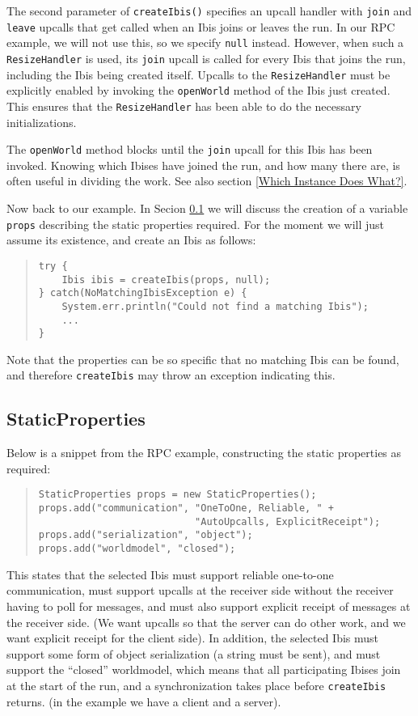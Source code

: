 \documentclass[10pt]{article}
\newcommand{\mysubsection}[1]{\subsection{#1}\label{#1}}
\begin{document}
The second parameter of \verb+createIbis()+ specifies an upcall handler
with \verb+join+ and \verb+leave+ upcalls that get called when an Ibis
joins or leaves the run.  In our RPC example, we will not use this, so we
specify \verb+null+ instead.  However, when such a \verb+ResizeHandler+
is used, its \verb+join+ upcall is called for every Ibis that joins the
run, including the Ibis being created itself.
Upcalls to the \verb+ResizeHandler+ must be explicitly enabled by
invoking the \verb+openWorld+ method of the Ibis
just created. This ensures that the \verb+ResizeHandler+ has been
able to do the necessary initializations.

The \verb+openWorld+ method blocks until the
\verb+join+ upcall for this Ibis has been invoked.  Knowing which Ibises
have joined the run, and how many there are, is often useful in dividing
the work. See also section \ref{Which Instance Does What?}.

Now back to our example. In Secion \ref{StaticProperties} we will
discuss the creation of a variable \texttt{props} describing the
static properties required. For the moment we will just assume its
existence, and create an Ibis as follows:
\begin{quote}
\begin{verbatim}
try {
    Ibis ibis = createIbis(props, null);
} catch(NoMatchingIbisException e) {
    System.err.println("Could not find a matching Ibis");
    ...
}
\end{verbatim}
\end{quote}
Note that the properties can be so specific that no matching Ibis
can be found, and therefore \verb+createIbis+ may throw an exception
indicating this.

\mysubsection{StaticProperties}

Below is a snippet from the RPC example, constructing the static
properties as required:
\begin{quote}
\begin{verbatim}
StaticProperties props = new StaticProperties();
props.add("communication", "OneToOne, Reliable, " + 
                           "AutoUpcalls, ExplicitReceipt");
props.add("serialization", "object");
props.add("worldmodel", "closed");
\end{verbatim}
\end{quote}
This states that the selected Ibis must support reliable one-to-one
communication, must support upcalls at the receiver side without the
receiver having to poll for messages, and must also support explicit
receipt of messages at the receiver side.
(We want upcalls so that the server can do other work, and we want
explicit receipt for the client side).
In addition, the selected Ibis must support some form of object
serialization (a string must be sent),
and must support the ``closed'' worldmodel, which means
that all participating Ibises join at the start of the run, and a
synchronization takes place before \verb+createIbis+ returns.
(in the example we have a client and a server).
\end{document}
